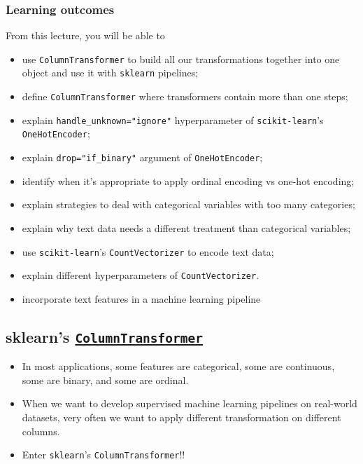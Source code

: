 \documentclass[11pt]{article}
\providecommand{\tightlist}{%
      \setlength{\itemsep}{0pt}\setlength{\parskip}{0pt}}
\begin{document}
    \subsubsection{Learning outcomes}\label{learning-outcomes}

From this lecture, you will be able to

\begin{itemize}
\tightlist
\item
  use \texttt{ColumnTransformer} to build all our transformations
  together into one object and use it with \texttt{sklearn} pipelines;\\
\item
  define \texttt{ColumnTransformer} where transformers contain more than
  one steps;
\item
  explain \texttt{handle\_unknown="ignore"} hyperparameter of
  \texttt{scikit-learn}'s \texttt{OneHotEncoder};
\item
  explain \texttt{drop="if\_binary"} argument of \texttt{OneHotEncoder};
\item
  identify when it's appropriate to apply ordinal encoding vs one-hot
  encoding;
\item
  explain strategies to deal with categorical variables with too many
  categories;
\item
  explain why text data needs a different treatment than categorical
  variables;
\item
  use \texttt{scikit-learn}'s \texttt{CountVectorizer} to encode text
  data;
\item
  explain different hyperparameters of \texttt{CountVectorizer}.
\item
  incorporate text features in a machine learning pipeline
\end{itemize}

    

    \subsection{\texorpdfstring{sklearn's
\href{https://scikit-learn.org/stable/modules/generated/sklearn.compose.ColumnTransformer.html}{\texttt{ColumnTransformer}}}{sklearn's ColumnTransformer}}\label{sklearns-columntransformer}

    \begin{itemize}
\item
  In most applications, some features are categorical, some are
  continuous, some are binary, and some are ordinal.
\item
  When we want to develop supervised machine learning pipelines on
  real-world datasets, very often we want to apply different
  transformation on different columns.
\item
  Enter \texttt{sklearn}'s \texttt{ColumnTransformer}!!
\end{itemize}
\end{document}
